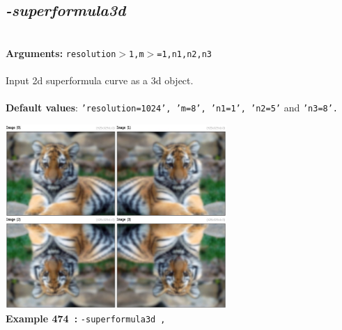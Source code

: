 \documentclass[a4paper,11pt,twoside]{book}
\begin{document}
\subsection{\emph{-superformula3d} }\vspace*{-0.5em}
~\\\textbf{Arguments: } 
{\small \texttt{resolution$>$1,m$>$=1,n1,n2,n3}}\\~\\
Input 2d superformula curve as a 3d object.
~\\~\\\textbf{Default values}: {\small \texttt{'resolution=1024', 'm=8', 'n1=1', 'n2=5'} and \texttt{'n3=8'.}}
\begin{center}\includegraphics[keepaspectratio=true,height=7cm,width=\textwidth]{img/gmic_def474.jpg}\\
{\footnotesize \textbf{Example 474~:} \texttt{-superformula3d ,}}
\end{center}
\end{document}
